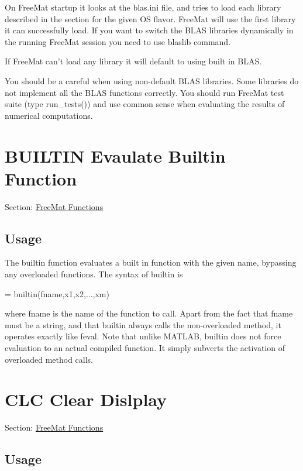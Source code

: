 On Free\-Mat startup it looks at the blas.\-ini file, and tries to load each library described in the section for the given O\-S flavor. Free\-Mat will use the first library it can successfully load. If you want to switch the B\-L\-A\-S libraries dynamically in the running Free\-Mat session you need to use blaslib command.

If Free\-Mat can't load any library it will default to using built in B\-L\-A\-S.

You should be a careful when using non-\/default B\-L\-A\-S libraries. Some libraries do not implement all the B\-L\-A\-S functions correctly. You should run Free\-Mat test suite (type {\ttfamily run\-\_\-tests()}) and use common sense when evaluating the results of numerical computations. \hypertarget{freemat_builtin}{}\section{B\-U\-I\-L\-T\-I\-N Evaulate Builtin Function}\label{freemat_builtin}
Section\-: \hyperlink{sec_freemat}{Free\-Mat Functions} \hypertarget{vtkwidgets_vtkxyplotwidget_Usage}{}\subsection{Usage}\label{vtkwidgets_vtkxyplotwidget_Usage}
The {\ttfamily builtin} function evaluates a built in function with the given name, bypassing any overloaded functions. The syntax of {\ttfamily builtin} is \begin{DoxyVerb}  [y1,y2,...,yn] = builtin(fname,x1,x2,...,xm)
\end{DoxyVerb}
 where {\ttfamily fname} is the name of the function to call. Apart from the fact that {\ttfamily fname} must be a string, and that {\ttfamily builtin} always calls the non-\/overloaded method, it operates exactly like {\ttfamily feval}. Note that unlike M\-A\-T\-L\-A\-B, {\ttfamily builtin} does not force evaluation to an actual compiled function. It simply subverts the activation of overloaded method calls. \hypertarget{freemat_clc}{}\section{C\-L\-C Clear Dislplay}\label{freemat_clc}
Section\-: \hyperlink{sec_freemat}{Free\-Mat Functions} \hypertarget{vtkwidgets_vtkxyplotwidget_Usage}{}\subsection{Usage}\label{vtkwidgets_vtkxyplotwidget_Usage}

